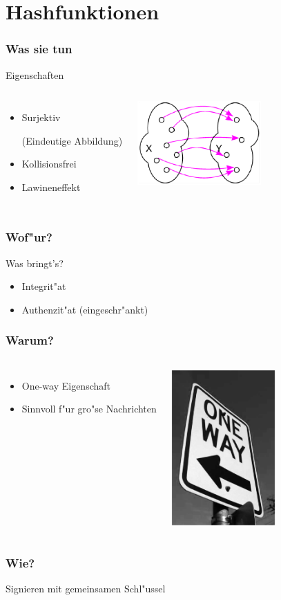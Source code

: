 \section{Hashfunktionen}

\begin{frame}
	\frametitle{Was sie tun}
	Eigenschaften
	\begin{columns}
	\column{6cm}
		\begin{itemize}
			\item Surjektiv \begin{small}(Eindeutige Abbildung)\end{small}
			\item Kollisionsfrei
			\item Lawineneffekt
		\end{itemize}
	\column{6cm}
		\begin{center}
			\includegraphics[width=4.8cm,height=3.2cm]{surjektiv.ps}
		\end{center}
	\end{columns}
\end{frame}

\begin{frame}
	\frametitle{Wof"ur?}
	Was bringt's?
	\begin{itemize}
		\item Integrit"at
		\item Authenzit"at \small{(eingeschr"ankt)}
	\end{itemize}

\end{frame}

\begin{frame}
\frametitle{Warum?}
	\begin{columns}
	\column{6cm}
		\begin{itemize}
			\item One-way Eigenschaft
			\item Sinnvoll f"ur gro"se Nachrichten
		\end{itemize}
	\column{6cm}
		\begin{center}
			\includegraphics[width=4cm,height=6cm]{oneway.ps}
		\end{center}
	\end{columns}
\end{frame}

\begin{frame}
\frametitle{Wie?}
	Signieren mit gemeinsamen Schl"ussel
	\par
\end{frame}


